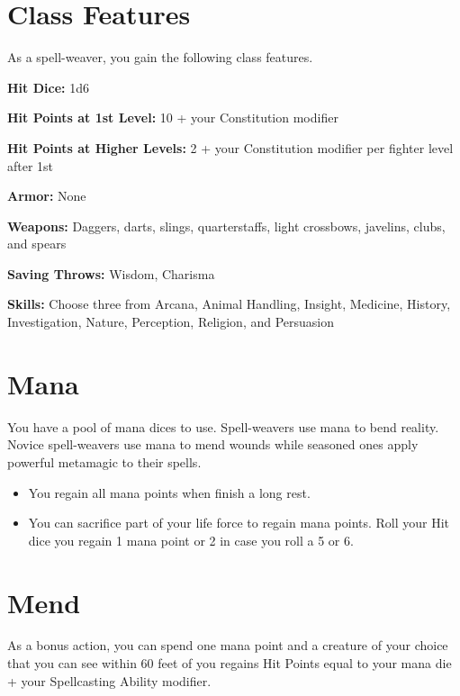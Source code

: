 \begin{multicols*}{2}

\section*{Class Features} 

As a spell-weaver, you gain the following class features.

\textbf{Hit Dice:} 1d6

\textbf{Hit Points at 1st Level:} 10 + your Constitution modifier

\textbf{Hit Points at Higher Levels:} 2 + your Constitution modifier per fighter level after 1st


\textbf{Armor:} None

\textbf{Weapons:} Daggers, darts, slings, quarterstaffs, light crossbows, javelins, clubs, and spears

\textbf{Saving Throws:} Wisdom, Charisma

\textbf{Skills:} Choose three from Arcana, Animal Handling, Insight, Medicine, History, Investigation, Nature, Perception, Religion, and Persuasion
    
\section*{Mana} 

You have a pool of mana dices to use. Spell-weavers use mana to bend reality. Novice spell-weavers use mana to mend wounds while seasoned ones apply powerful metamagic to their spells.



\begin{itemize}
    \item You regain all mana points when finish a long rest.
    \item You can sacrifice part of your life force to regain mana points. Roll your Hit dice you regain 1 mana point or 2 in case you roll a 5 or 6.
\end{itemize}


    
\section*{Mend} 

As a bonus action, you can spend one mana point and a creature of your choice that you can see within 60 feet of you regains Hit Points equal to your mana die + your Spellcasting Ability modifier.




\end{multicols*}
